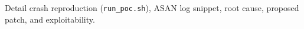Detail crash reproduction (\texttt{run\_poc.sh}), ASAN log snippet, root cause, proposed patch, and exploitability.
